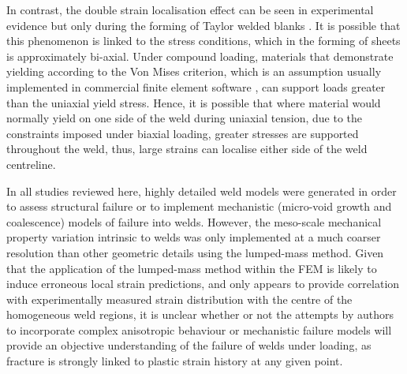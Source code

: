In contrast, the double strain localisation effect can be seen in experimental evidence but only during the forming of Taylor welded blanks \cite{Zhao2001,Kim2010,Kim2010a}. It is possible that this phenomenon is linked to the stress conditions, which in the forming of sheets is approximately bi-axial. Under compound loading, materials that demonstrate yielding according to the Von Mises criterion, which is an assumption usually implemented in commercial finite element software \cite{Hallquist2006,Systemes2010}, can support loads greater than the uniaxial yield stress. %
Hence, it is possible that where material would normally yield on one side of the weld during uniaxial tension, due to the constraints imposed under biaxial loading, greater stresses are supported throughout the weld, thus, large strains can localise either side of the weld centreline. %
%
%

In all studies reviewed here, highly detailed weld models were generated in order to assess structural failure or to implement mechanistic (micro-void growth and coalescence) models of failure into welds. However, the meso-scale mechanical property variation intrinsic to welds was only implemented at a much coarser resolution than other geometric details using the lumped-mass method. Given that the application of the lumped-mass method within the FEM is likely to induce erroneous local strain predictions, and only appears to provide correlation with experimentally measured strain distribution with the centre of the homogeneous weld regions, it is unclear whether or not the attempts by authors to incorporate complex anisotropic behaviour \cite{Kim2010,Kim2010a} or mechanistic failure models \cite{Chien2003a} will provide an objective understanding of the failure of welds under loading, as fracture is strongly linked to plastic strain history at any given point. 

